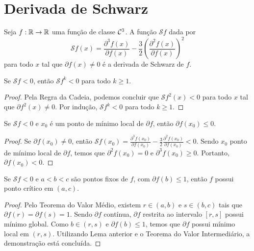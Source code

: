 \section{Derivada de Schwarz}

\begin{definition}
Seja $f: \mathbb{R} \to \mathbb{R}$ uma função de classe $\mathcal{C}^3$. A função $\mathcal{S}f$ dada por
$$\mathcal{S}f(x) = \frac{\partial^3 f(x)}{\partial f(x)} - \frac{3}{2} \left( \frac{\partial^2 f(x)}{\partial f(x)} \right)^2$$
para todo $x$ tal que $\partial f(x) \neq 0$ é a derivada de Schwarz de $f$.
\end{definition}

\begin{lemma}
Se $\mathcal{S}f < 0$, então $\mathcal{S}f^k < 0$ para todo $k \geq 1$.
\end{lemma}

\begin{proof}
Pela Regra da Cadeia, podemos concluir que $\mathcal{S}f^2(x) < 0$ para todo $x$ tal que $\partial f^2(x) \neq 0$. Por indução, $\mathcal{S}f^k < 0$ para todo $k \geq 1$.
\end{proof}

\begin{lemma}
\label{lemma1}
Se $\mathcal{S}f < 0$ e $x_0$ é um ponto de mínimo local de $\partial f$, então $\partial f(x_0) \leq 0$.
\end{lemma}

\begin{proof}
Se $\partial f(x_0) \neq 0$, então $\mathcal{S}f(x_0) = \frac{\partial^3 f(x_0)}{\partial f(x_0)} - \frac{3}{2} \frac{\partial^2 f(x_0)}{\partial f(x_0)} < 0$. Sendo $x_0$ ponto de mínimo local de $\partial f$, temos que $\partial^2 f(x_0) = 0$ e $\partial^3 f(x_0) \geq 0$. Portanto,  $\partial f(x_0) < 0$. 
\end{proof}

\begin{lemma}
\label{lemma2}
Se $\mathcal{S}f < 0$ e $a<b<c$ são pontos fixos de $f$, com $\partial f(b) \leq 1$, então $f$ possui ponto crítico em $(a, c)$.
\end{lemma}

\begin{proof}
Pelo Teorema do Valor Médio, existem $r \in (a,b)$ e $s \in (b,c)$  tais que $\partial f(r) = \partial f(s) = 1$. Sendo $\partial f$ contínua, $\partial f$ restrita ao intervalo $[r,s]$ possui mínimo global. Como $b \in (r,s)$ e $\partial f(b) \leq 1$, temos que $\partial f$ possui mínimo local em $(r,s)$. Utilizando Lema anterior e o Teorema do Valor Intermediário, a demonstração está concluída.
\end{proof}

